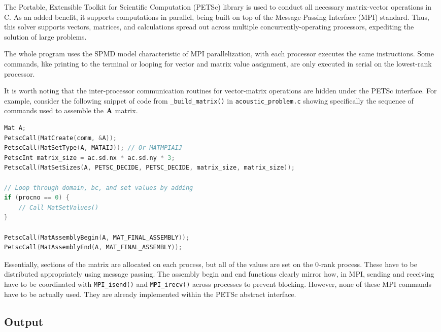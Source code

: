 \documentclass{article}
\begin{document}
The Portable, Extensible Toolkit for Scientific Computation (PETSc) library is used to conduct all necessary matrix-vector operations in C. As an added benefit, it supports computations in parallel, being built on top of the Message-Passing Interface (MPI) standard. Thus, this solver supports vectors, matrices, and calculations spread out across multiple concurrently-operating processors, expediting the solution of large problems.

The whole program uses the SPMD model characteristic of MPI parallelization, with each processor executes the same instructions. Some commands, like printing to the terminal or looping for vector and matrix value assignment, are only executed in serial on the lowest-rank processor.

It is worth noting that the inter-processor communication routines for vector-matrix operations are hidden under the PETSc interface. For example, consider the following snippet of code from \verb|_build_matrix()| in \verb|acoustic_problem.c| showing specifically the sequence of commands used to assemble the $\vb{A}$ matrix.

\begin{lstlisting}[language=C]
Mat A;
PetscCall(MatCreate(comm, &A));
PetscCall(MatSetType(A, MATAIJ)); // Or MATMPIAIJ
PetscInt matrix_size = ac.sd.nx * ac.sd.ny * 3;
PetscCall(MatSetSizes(A, PETSC_DECIDE, PETSC_DECIDE, matrix_size, matrix_size));

// Loop through domain, bc, and set values by adding
if (procno == 0) {
	// Call MatSetValues()
}

PetscCall(MatAssemblyBegin(A, MAT_FINAL_ASSEMBLY));
PetscCall(MatAssemblyEnd(A, MAT_FINAL_ASSEMBLY));
\end{lstlisting}

Essentially, sections of the matrix are allocated on each process, but all of the values are set on the 0-rank process. These have to be distributed appropriately using message passing. The assembly begin and end functions clearly mirror how, in MPI, sending and receiving have to be coordinated with \verb|MPI_isend()| and \verb|MPI_irecv()| across processes to prevent blocking. However, none of these MPI commands have to be actually used. They are already implemented within the PETSc abstract interface.

\subsection{Output}
\end{document}
